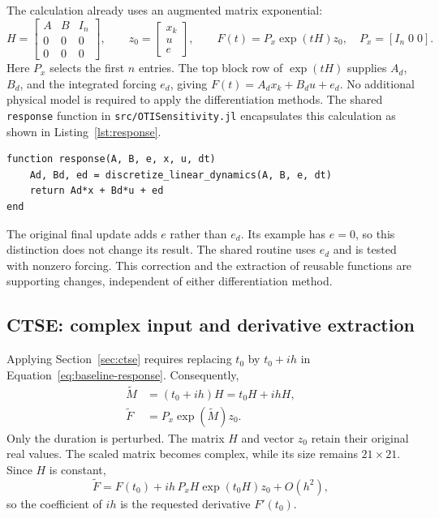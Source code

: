 \documentclass[10pt]{article}
\begin{document}
The calculation already uses an augmented matrix exponential:
\begin{equation}
\label{eq:baseline-response}
 H=\begin{bmatrix}A&B&I_n\\0&0&0\\0&0&0\end{bmatrix},\qquad
 z_0=\begin{bmatrix}x_k\\u\\e\end{bmatrix},\qquad
 F(t)=P_x\exp(tH)z_0,\quad P_x=[I_n\;0\;0].
\end{equation}
Here $P_x$ selects the first $n$ entries. The top block row of $\exp(tH)$ supplies
$A_d$, $B_d$, and the integrated forcing $e_d$, giving $F(t)=A_dx_k+B_du+e_d$.
No additional physical model is required to apply the differentiation methods.
The shared \texttt{response} function in \texttt{src/OTISensitivity.jl}
encapsulates this calculation as shown in Listing~\ref{lst:response}.
\begin{lstlisting}[caption={Reusable response evaluation.},label={lst:response}]
function response(A, B, e, x, u, dt)
    Ad, Bd, ed = discretize_linear_dynamics(A, B, e, dt)
    return Ad*x + Bd*u + ed
end
\end{lstlisting}
The original final update adds $e$ rather than $e_d$. Its example has $e=0$, so
this distinction does not change its result. The shared routine uses $e_d$ and
is tested with nonzero forcing. This correction and the extraction of reusable
functions are supporting changes, independent of either differentiation method.

\subsection{CTSE: complex input and derivative extraction}
\label{sec:ctse-code}
\label{sec:ctse-thermal}
Applying Section~\ref{sec:ctse} requires replacing $t_0$ by $t_0+ih$ in
Equation~\eqref{eq:baseline-response}. Consequently,
\begin{align}
 \widetilde M&=(t_0+ih)H=t_0H+ihH,\label{eq:ctse-matrix}\\
 \widetilde F&=P_x\exp(\widetilde M)z_0.\label{eq:ctse-response}
\end{align}
Only the duration is perturbed. The matrix $H$ and vector $z_0$ retain their
original real values. The scaled matrix becomes complex, while its size remains
$21\times21$. Since $H$ is constant,
\[
 \widetilde F=F(t_0)+ih\,P_xH\exp(t_0H)z_0+O(h^2),
\]
so the coefficient of $ih$ is the requested derivative $F'(t_0)$.
\end{document}
